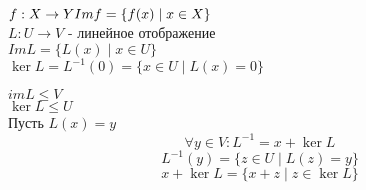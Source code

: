 \documentclass[12pt]{report}
\begin{document}
\begin{defn}
$f: X \to Y \\
Im f = \{f(x) \mid x \in X\}$\\
$L: U \to V $ - линейное отображение \\
$ Im L = \{L(x) \mid x\in U\}$\\
$\ker L = L^{-1}(0) = \{x \in U \mid L(x) = 0\}$
\end{defn}
\begin{lm}$ $\\
    $ im L \le V$\\
    $ \ker L \le U$\\
    Пусть $L(x) = y$\\
    $$ \forall y \in V : L^{-1} = x + \ker L$$
	$$ L^{-1} (y) = \{z \in U \mid L(z) = y\}$$
	$$ x + \ker L = \{x+z \mid z \in \ker L\}$$
\end{lm}
\end{document}
